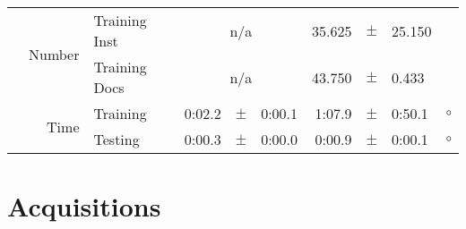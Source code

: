 \begin{longtable}{|r|r|l||rcl|rcl|c|}
\cline{2-10} & \multirow{2}{*}{    Number} &   Training Inst &    \multicolumn{3}{c|}{n/a}         &      35.625 &  $\pm$  &      25.150 &  \\
\cline{3-10} &                             &   Training Docs &    \multicolumn{3}{c|}{n/a}         &      43.750 &  $\pm$  &       0.433 &  \\
\cline{2-10} & \multirow{2}{*}{      Time} &        Training &      0:02.2 &  $\pm$  &      0:00.1 &      1:07.9 &  $\pm$  &      0:50.1 & $\circ$ \\
\cline{3-10} &                             &         Testing &      0:00.3 &  $\pm$  &      0:00.0 &      0:00.9 &  $\pm$  &      0:00.1 & $\circ$ \\
\hline
\end{longtable}

\clearpage

\section{Acquisitions}


